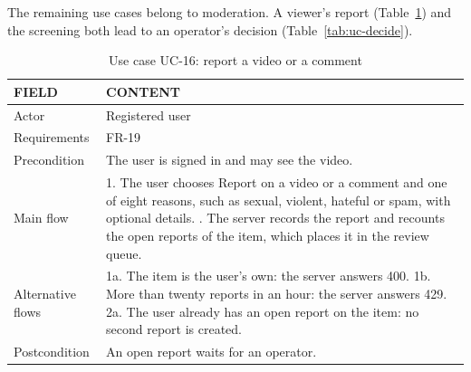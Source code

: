 The remaining use cases belong to moderation. A viewer's report (Table~\ref{tab:uc-report}) and
the screening both lead to an operator's decision (Table~\ref{tab:uc-decide}).

\begin{table}[H]
\centering
\caption{Use case UC-16: report a video or a comment}
\label{tab:uc-report}
\small
\begin{tabularx}{\textwidth}{p{} X}
\toprule
\textbf{FIELD} & \textbf{CONTENT} \\
\midrule
Actor & Registered user \\
Requirements & FR-19 \\
Precondition & The user is signed in and may see the video. \\
Main flow &
  1. The user chooses Report on a video or a comment and one of eight reasons, such as sexual, violent, hateful or spam, with optional details. \newline
  2. The server records the report and recounts the open reports of the item, which places it in the review queue. \\
Alternative flows &
  1a. The item is the user's own: the server answers 400. \newline
  1b. More than twenty reports in an hour: the server answers 429. \newline
  2a. The user already has an open report on the item: no second report is created. \\
Postcondition & An open report waits for an operator. \\
\bottomrule
\end{tabularx}
\end{table}

